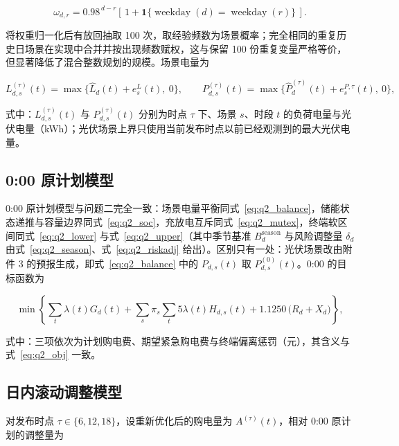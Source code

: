 \begin{equation}
  \omega_{d,r} = 0.98^{\,d-r}\left[\,1 + \mathbf{1}\{\operatorname{weekday}(d)=\operatorname{weekday}(r)\}\,\right].
  \label{eq:q3_weight}
\end{equation}

将权重归一化后有放回抽取 100 次，取经验频数为场景概率；完全相同的重复历史日场景在实现中合并并按出现频数赋权，这与保留 100 份重复变量严格等价，但显著降低了混合整数规划的规模。场景电量为

\begin{equation}
  L^{(\tau)}_{d,s}(t) = \max\{\widehat{L}_d(t) + e^L_s(t),\ 0\},
  \qquad
  P^{(\tau)}_{d,s}(t) = \max\{\widehat{P}^{(\tau)}_d(t) + e^{P,\tau}_s(t),\ 0\},
  \label{eq:q3_scenario}
\end{equation}

式中：$L^{(\tau)}_{d,s}(t)$ 与 $P^{(\tau)}_{d,s}(t)$ 分别为时点 $\tau$ 下、场景 $s$、时段 $t$ 的负荷电量与光伏电量（kWh）；光伏场景上界只使用当前发布时点以前已经观测到的最大光伏电量。

\subsection{0:00 原计划模型}

0:00 原计划模型与问题二完全一致：场景电量平衡同式~\eqref{eq:q2_balance}，储能状态递推与容量边界同式~\eqref{eq:q2_soc}，充放电互斥同式~\eqref{eq:q2_mutex}，终端软区间同式~\eqref{eq:q2_lower} 与式~\eqref{eq:q2_upper}（其中季节基准 $B_d^{\mathrm{season}}$ 与风险调整量 $\delta_d$ 由式~\eqref{eq:q2_season}、式~\eqref{eq:q2_riskadj} 给出）。区别只有一处：光伏场景改由附件 3 的预报生成，即式~\eqref{eq:q2_balance} 中的 $P_{d,s}(t)$ 取 $P^{(0)}_{d,s}(t)$。0:00 的目标函数为

\begin{equation}
  \min\left\{
    \sum_t \lambda(t) G_d(t)
    + \sum_s \pi_s \sum_t 5\lambda(t) H_{d,s}(t)
    + 1.1250\,\bigl(R_d + X_d\bigr)
  \right\},
  \label{eq:q3_obj0}
\end{equation}

式中：三项依次为计划购电费、期望紧急购电费与终端偏离惩罚（元），其含义与式~\eqref{eq:q2_obj} 一致。

\subsection{日内滚动调整模型}

对发布时点 $\tau \in \{6,12,18\}$，设重新优化后的购电量为 $A^{(\tau)}(t)$，相对 0:00 原计划的调整量为

